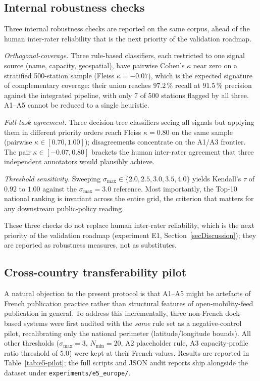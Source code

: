 \documentclass[11pt,a4paper]{article}
\begin{document}
\subsection{Internal robustness checks}\label{secInternal}
Three internal robustness checks are reported on the same corpus,
ahead of the human inter-rater reliability that is the next
priority of the validation roadmap.

\emph{Orthogonal-coverage.}
Three rule-based classifiers, each restricted to one signal source
(name, capacity, geospatial), have pairwise Cohen's $\kappa$ near
zero on a stratified 500-station sample (Fleiss $\kappa = -0.07$),
which is the expected signature of complementary coverage: their
union reaches $97.2\,\%$ recall at $91.5\,\%$ precision against the
integrated pipeline, with only 7 of 500 stations flagged by all
three. A1--A5 cannot be reduced to a single heuristic.

\emph{Full-task agreement.}
Three decision-tree classifiers seeing all signals but applying them
in different priority orders reach Fleiss $\kappa = 0.80$ on the
same sample (pairwise $\kappa \in [0.70, 1.00]$); disagreements
concentrate on the A1/A3 frontier. The pair
$\kappa \in [-0.07, 0.80]$ brackets the human inter-rater agreement
that three independent annotators would plausibly achieve.

\emph{Threshold sensitivity.}
Sweeping $\sigma_{\max} \in \{2.0, 2.5, 3.0, 3.5, 4.0\}$ yields
Kendall's $\tau$ of $0.92$ to $1.00$ against the
$\sigma_{\max} = 3.0$ reference. Most importantly, the Top-10
national ranking is invariant across the entire grid, the criterion
that matters for any downstream public-policy reading.

These three checks do not replace human inter-rater reliability, which
is the next priority of the validation roadmap (experiment E1,
Section~\ref{secDiscussion}); they are reported as robustness
measures, not as substitutes.

\subsection{Cross-country transferability pilot}
A natural objection to the present protocol is that A1--A5 might be
artefacts of French publication practice rather than structural
features of open-mobility-feed publication in general. To address this
incrementally, three non-French dock-based systems were first audited
with the \emph{same} rule set as a negative-control pilot, recalibrating
only the national perimeter
(latitude/longitude bounds). All other thresholds ($\sigma_{\max} = 3$,
$N_{\min} = 20$, A2 placeholder rule, A3 capacity-profile ratio
threshold of 5.0) were kept at their French values. Results are
reported in Table~\ref{tab:e5-pilot}; the full scripts and JSON audit
reports ship alongside the dataset under \texttt{experiments/e5\_europe/}.
\end{document}
